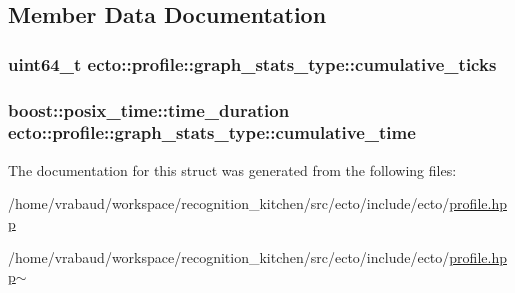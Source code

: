 \subsection{Member Data Documentation}
\hypertarget{structecto_1_1profile_1_1graph__stats__type_a0d465d23569a8af1789c0b57ccb21017}{
\subsubsection[{cumulative\-\_\-ticks}]{\setlength{\rightskip}{0pt plus 5cm}uint64\-\_\-t ecto\-::profile\-::graph\-\_\-stats\-\_\-type\-::cumulative\-\_\-ticks}}\label{structecto_1_1profile_1_1graph__stats__type_a0d465d23569a8af1789c0b57ccb21017}
\hypertarget{structecto_1_1profile_1_1graph__stats__type_a340d79ae72ca5639e55098c860640ba8}{
\subsubsection[{cumulative\-\_\-time}]{\setlength{\rightskip}{0pt plus 5cm}boost\-::posix\-\_\-time\-::time\-\_\-duration ecto\-::profile\-::graph\-\_\-stats\-\_\-type\-::cumulative\-\_\-time}}\label{structecto_1_1profile_1_1graph__stats__type_a340d79ae72ca5639e55098c860640ba8}


The documentation for this struct was generated from the following files\-:\begin{DoxyCompactItemize}
\item 
/home/vrabaud/workspace/recognition\-\_\-kitchen/src/ecto/include/ecto/\hyperlink{profile_8hpp}{profile.\-hpp}\item 
/home/vrabaud/workspace/recognition\-\_\-kitchen/src/ecto/include/ecto/\hyperlink{profile_8hpp~}{profile.\-hpp$\sim$}\end{DoxyCompactItemize}
